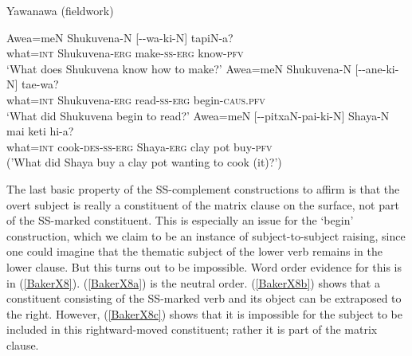 \documentclass[output=paper,colorlinks,citecolor=brown,
]{langscibook}
\renewcommand{\sc}[1]{\textsc{#1}}
\begin{document}
\begin{exe}
    \ex Yawanawa (fieldwork) \label{BakerX7}
        \begin{xlist}
        \ex \label{BakerX7a}
			\gll Awea=meN Shukuvena-N [\hspace{3pt}-\hspace{0pt}-\hspace{3pt}wa-ki-N] tapiN-a?\\
			     what=\sc{int} Shukuvena-\sc{erg} make-\sc{ss-erg} know-\sc{pfv}\\
			    \glt `What does Shukuvena know how to make?'
		\ex \label{BakerX7b}
			\gll Awea=meN Shukuvena-N [\hspace{3pt}-\hspace{0pt}-\hspace{3pt}ane-ki-N] tae-wa?\\
    			 what=\sc{int} Shukuvena-\sc{erg} read-\sc{ss-erg} begin-\sc{caus.pfv}\\
			    \glt `What did Shukuvena begin to read?'
		\ex \label{BakerX7c}
		    \gll *Awea=meN [\hspace{3pt}-\hspace{0pt}-\hspace{3pt}pitxaN-pai-ki-N] Shaya-N mai keti hi-a?\\
		        what=\sc{int} cook-\sc{des-ss-erg} Shaya-\sc{erg} clay pot buy-\sc{pfv}\\
		        \glt ('What did Shaya buy a clay pot wanting to cook (it)?')
        \end{xlist}
\end{exe}

The last basic property of the SS-complement constructions to affirm is that the overt subject is really a constituent of the matrix clause on the surface, not part of the SS-marked constituent. This is especially an issue for the `begin’ construction, which we claim to be an instance of subject-to-subject raising, since one could imagine that the thematic subject of the lower verb remains in the lower clause. But this turns out to be impossible. Word order evidence for this is in (\ref{BakerX8}). (\ref{BakerX8a}) is the neutral order. (\ref{BakerX8b}) shows that a constituent consisting of the SS-marked verb and its object can be extraposed to the right. However, (\ref{BakerX8c}) shows that it is impossible for the subject to be included in this rightward-moved constituent; rather it is part of the matrix clause.
\end{document}
